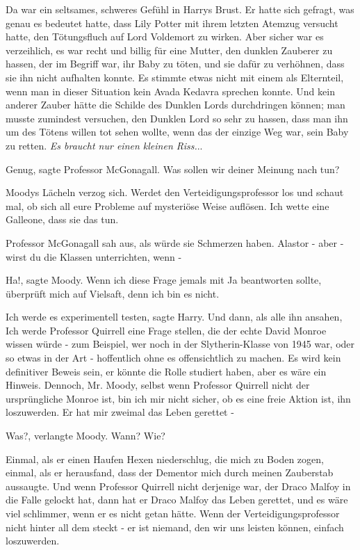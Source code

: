 Da war ein seltsames, schweres Gefühl in Harrys Brust. Er hatte sich gefragt,
was genau es bedeutet hatte, dass Lily Potter mit ihrem letzten Atemzug versucht
hatte, den Tötungsfluch auf Lord Voldemort zu wirken. Aber sicher war es
verzeihlich, es war recht und billig für eine Mutter, den dunklen Zauberer zu
hassen, der im Begriff war, ihr Baby zu töten, und sie dafür zu verhöhnen, dass
sie ihn nicht aufhalten konnte. Es stimmte etwas nicht mit einem als Elternteil,
wenn man in dieser Situation kein Avada Kedavra sprechen konnte. Und kein
anderer Zauber hätte die Schilde des Dunklen Lords durchdringen können; man
musste zumindest versuchen, den Dunklen Lord so sehr zu hassen, dass man ihn um
des Tötens willen tot sehen wollte, wenn das der einzige Weg war, sein Baby zu
retten. \emph{Es braucht nur einen kleinen Riss.}..

\glqq Genug\grqq{}, sagte Professor McGonagall. \glqq Was sollen wir deiner
Meinung nach tun?\grqq{}

Moodys Lächeln verzog sich. \glqq Werdet den Verteidigungsprofessor los und
schaut mal, ob sich all eure Probleme auf mysteriöse Weise auflösen. Ich wette
eine Galleone, dass sie das tun.\grqq{}

Professor McGonagall sah aus, als würde sie Schmerzen haben. \glqq Alastor -
aber - wirst du die Klassen unterrichten, wenn -\grqq{}

\glqq Ha!\grqq{}, sagte Moody. \glqq Wenn ich diese Frage jemals mit Ja
beantworten sollte, überprüft mich auf Vielsaft, denn ich bin es nicht.\grqq{}

\glqq Ich werde es experimentell testen\grqq{}, sagte Harry. Und dann, als alle
ihn ansahen, \glqq Ich werde Professor Quirrell eine Frage stellen, die der
echte David Monroe wissen würde - zum Beispiel, wer noch in der Slytherin-Klasse
von 1945 war, oder so etwas in der Art - hoffentlich ohne es offensichtlich zu
machen. Es wird kein definitiver Beweis sein, er könnte die Rolle studiert
haben, aber es wäre ein Hinweis. Dennoch, Mr. Moody, selbst wenn Professor
Quirrell nicht der ursprüngliche Monroe ist, bin ich mir nicht sicher, ob es
eine freie Aktion ist, ihn loszuwerden. Er hat mir zweimal das Leben gerettet
-\grqq{}

\glqq Was?\grqq{}, verlangte Moody. \glqq Wann? Wie?\grqq{}

\glqq Einmal, als er einen Haufen Hexen niederschlug, die mich zu Boden zogen,
einmal, als er herausfand, dass der Dementor mich durch meinen Zauberstab
aussaugte. Und wenn Professor Quirrell nicht derjenige war, der Draco Malfoy in
die Falle gelockt hat, dann hat er Draco Malfoy das Leben gerettet, und es wäre
viel schlimmer, wenn er es nicht getan hätte. Wenn der Verteidigungsprofessor
nicht hinter all dem steckt - er ist niemand, den wir uns leisten können,
einfach loszuwerden.\grqq{}

